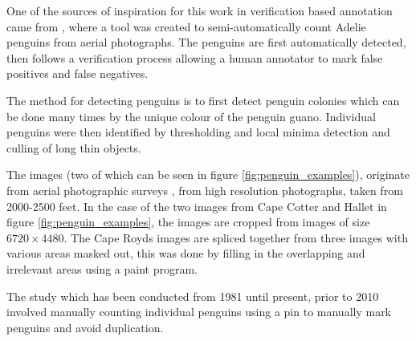 One of the sources of inspiration for this work in verification based annotation came from \cite{McNeill2011}, where a tool was created to semi-automatically count Adelie penguins from aerial photographs. The penguins are first automatically detected, then follows a verification process allowing a human annotator to mark false positives and false negatives.

The method for detecting penguins is to first detect penguin colonies which can be done many times by the unique colour of the penguin guano. Individual penguins were then identified by thresholding and local minima detection and culling of long thin objects. 

The images (two of which can be seen in figure \ref{fig:penguin_examples}), originate from aerial photographic surveys \cite{Lyver2014}, from high resolution photographs, taken from 2000-2500 feet. In the case of the two images from Cape Cotter and Hallet in figure \ref{fig:penguin_examples}, the images are cropped from images of size $ 6720\times4480 $. The Cape Royds images are spliced together from three images with various areas masked out, this was done by filling in the overlapping and irrelevant areas using a paint program.

The study which has been conducted from 1981 until present, prior to 2010 involved manually counting individual penguins using a pin to manually mark penguins and avoid duplication. 



